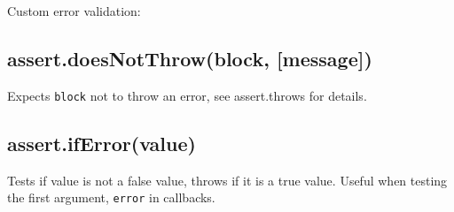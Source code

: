 Custom error validation:

\begin{Shaded}
\begin{Highlighting}[]
\NormalTok{(}
  \NormalTok{() \{}
      \NormalTok{);}
  \NormalTok{\},}
     
       \NormalTok{;}
    \NormalTok{\}}
  \NormalTok{\},}
\NormalTok{);}
\end{Highlighting}
\end{Shaded}

\subsection{assert.doesNotThrow(block, {[}message{]})}

Expects \texttt{block} not to throw an error, see assert.throws for
details.

\subsection{assert.ifError(value)}

Tests if value is not a false value, throws if it is a true value.
Useful when testing the first argument, \texttt{error} in callbacks.

